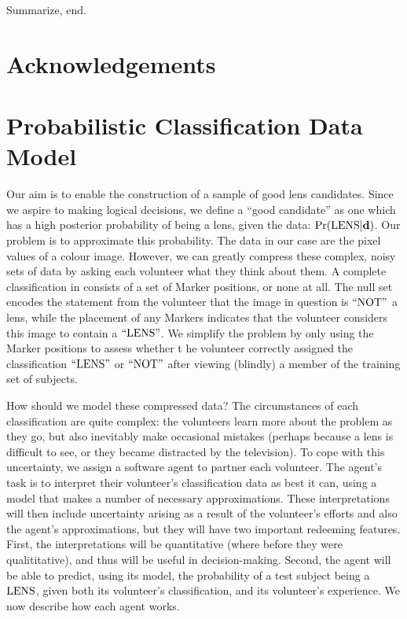 \documentclass[useAMS,usenatbib,a4paper]{mn2e}
\begin{document}
Summarize, end.


\section*{Acknowledgements}
 



\appendix


\section{Probabilistic Classification Data Model}
\label{appendix:probmodel}

Our aim is to enable the construction of a sample of good lens candidates.
Since we aspire to making logical  decisions, we define a  ``good candidate''
as one which has a high posterior probability of being a lens, given the data:
${\rm Pr}({\rm LENS}|{\mathbf{d}})$. Our problem is to approximate this probability. The data
in our case are the pixel values of a colour image. However, we can greatly
compress these complex, noisy sets of data by asking each volunteer what they
think about them. A complete  classification in \sw consists of a set of
Marker positions, or none at all. The null set encodes the statement from
the volunteer that the image in question is ${\rm ``NOT"}$ a lens, while the
placement of any  Markers indicates that the volunteer considers this image to
contain a ${\rm ``LENS"}$.  We simplify the problem by only using the Marker
positions to assess whether t
he volunteer  correctly assigned the
classification ${\rm ``LENS"}$ or ${\rm ``NOT"}$ after viewing (blindly) a member of
the training set of subjects. 

How should we model these compressed data? The circumstances of each
classification are quite complex: the volunteers learn more about the problem
as they go, but also inevitably make occasional mistakes (perhaps because a
lens is difficult to see, or they became distracted by the television). To
cope with this uncertainty, we assign a software agent to partner each
volunteer. The agent's task is to interpret their volunteer's classification
data as best it can, using a model that makes a number of necessary
approximations. These interpretations will then include uncertainty arising as
a result of the volunteer's efforts and also the agent's approximations, but
they will have two important redeeming features. First, the interpretations
will be quantitative (where before they were qualititative),  and thus will be
useful in decision-making. Second, the agent will be able to predict, using
its model, the probability of a test subject being a ${\rm LENS}$, given both its
volunteer's classification, and its volunteer's experience. We now
describe how each agent works.
\end{document}
